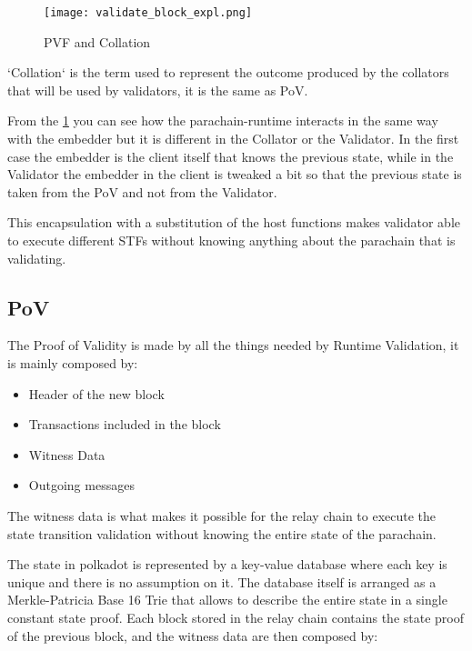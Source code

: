 \begin{figure}[h]
  \centering
  \texttt{[image: validate\_block\_expl.png]}
  \caption{PVF and Collation}
  \label{fig:pvf_pov}
\end{figure}

`Collation` is the term used to represent the outcome produced by the collators that will be used by validators, it is the same as PoV.


From the \ref{fig:pvf_pov} you can see how the parachain-runtime interacts in the same way with the embedder but it is different in the Collator or the Validator. In the first case the embedder is the client itself that knows the previous state, while in the Validator the embedder in the client is tweaked a bit so that the previous state is taken from the PoV and not from the Validator.

This encapsulation with a substitution of the host functions makes  validator able to execute different STFs without knowing anything about the parachain that is validating.

\subsection{PoV}

The Proof of Validity is made by all the things needed by Runtime Validation, it is mainly composed by:~\cite{cumulus-docs}

\begin{itemize}
  \item Header of the new block
  \item Transactions included in the block
  \item Witness Data
  \item Outgoing messages
\end{itemize}

The witness data is what makes it possible for the relay chain to execute the state transition validation without knowing the entire state of the parachain.

The state in polkadot is represented by a key-value database where each key is unique and there is no assumption on it. The database itself is arranged as a Merkle-Patricia Base 16 Trie that allows to describe the entire state in a single constant state proof. Each block stored in the relay chain contains the state proof of the previous block, and the witness data are then composed by:



